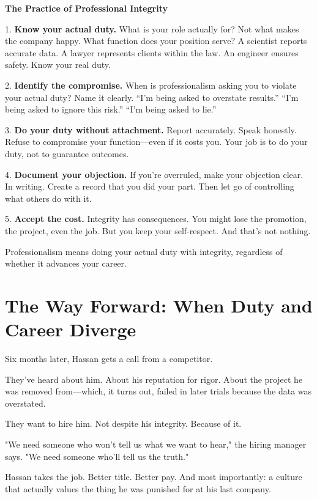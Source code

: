 \documentclass[11pt,twoside]{book}
\begin{document}
\begin{practicebox}
\textbf{The Practice of Professional Integrity}

1. \textbf{Know your actual duty.} What is your role actually for? Not what makes the company happy. What function does your position serve? A scientist reports accurate data. A lawyer represents clients within the law. An engineer ensures safety. Know your real duty.

2. \textbf{Identify the compromise.} When is professionalism asking you to violate your actual duty? Name it clearly. ``I'm being asked to overstate results.'' ``I'm being asked to ignore this risk.'' ``I'm being asked to lie.''

3. \textbf{Do your duty without attachment.} Report accurately. Speak honestly. Refuse to compromise your function—even if it costs you. Your job is to do your duty, not to guarantee outcomes.

4. \textbf{Document your objection.} If you're overruled, make your objection clear. In writing. Create a record that you did your part. Then let go of controlling what others do with it.

5. \textbf{Accept the cost.} Integrity has consequences. You might lose the promotion, the project, even the job. But you keep your self-respect. And that's not nothing.

Professionalism means doing your actual duty with integrity, regardless of whether it advances your career.
\end{practicebox}

\section*{The Way Forward: When Duty and Career Diverge}

Six months later, Hassan gets a call from a competitor.

They've heard about him. About his reputation for rigor. About the project he was removed from—which, it turns out, failed in later trials because the data was overstated.

They want to hire him. Not despite his integrity. Because of it.

"We need someone who won't tell us what we want to hear," the hiring manager says. "We need someone who'll tell us the truth."

Hassan takes the job. Better title. Better pay. And most importantly: a culture that actually values the thing he was punished for at his last company.
\end{document}
